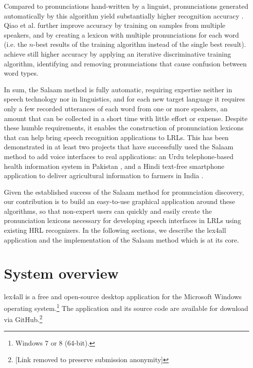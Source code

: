 \documentclass[11pt]{article}
\begin{document}
Compared to pronunciations hand-written by a linguist, pronunciations generated automatically by this algorithm yield substantially higher recognition accuracy \cite[\S5.2]{Qiao10}. Qiao et al. further improve accuracy by training on samples from multiple speakers, and by creating a lexicon with multiple pronunciations for each word (i.e. the $n$-best results of the training algorithm instead of the single best result).
 achieve still higher accuracy by applying an iterative discriminative training algorithm, identifying and removing pronunciations that cause confusion between word types.

In sum, the Salaam method is fully automatic, requiring expertise neither in speech technology 
nor in linguistics,
and for each new target language it requires only a few recorded utterances of each word from one or more speakers, an amount that can be collected in a short time with little effort or expense. Despite these humble requirements, it enables the construction of pronunciation lexicons that can help bring speech recognition applications to LRLs. This has been demonstrated in at least two projects that have successfully used the Salaam method to add voice interfaces to real applications: an Urdu telephone-based health information system in Pakistan \cite{Sherwani09}, and a Hindi text-free  smartphone application to deliver agricultural information to farmers in India \cite{bali13}.


Given the established success of the Salaam method for pronunciation discovery, our contribution is to build an easy-to-use graphical application around these algorithms, so that non-expert users can quickly and easily create the pronunciation lexicons necessary for developing speech interfaces in LRLs using existing HRL recognizers. In the following sections, we describe the lex4all application and the implementation of the Salaam method which is at its core.


\section{System overview}
\label{sec:overview}

lex4all is a free and open-source desktop application for the Microsoft Windows operating system.\footnote{Windows 7 or 8 (64-bit).}  The application and its source code are available for download via GitHub.\footnote{[Link removed to preserve submission anonymity]}
\end{document}
